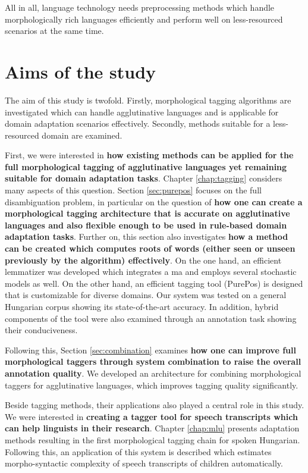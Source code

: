 All in all, language technology needs preprocessing methods which handle morphologically rich languages efficiently 
and perform well on less-resourced scenarios at the same time.

\section{Aims of the study}

The aim of this study is twofold. 
Firstly, morphological tagging algorithms are investigated which can handle agglutinative languages and is applicable for domain adaptation scenarios effectively. 
Secondly, methods suitable for a less-resourced domain are examined.

First, we were interested in \textbf{how existing methods can be applied for the full morphological tagging of agglutinative languages yet remaining suitable for domain adaptation tasks}. 
Chapter \ref{chap:tagging} considers many aspects of this question. 
Section \ref{sec:purepos} focuses on the full disambiguation problem, in particular on the question of \textbf{how one can create a morphological tagging architecture that is accurate on agglutinative languages and also flexible enough to be used in rule-based domain adaptation tasks}.
Further on,  this section also investigates \textbf{how a method can be created which computes roots of words (either seen or unseen previously by the algorithm) effectively}. 
On the one hand, an efficient lemmatizer was developed which integrates a \gls{ma} and employs several stochastic models as well. %
On the other hand, an efficient tagging tool (PurePos) is designed that is customizable for diverse domains.
Our system was tested on a general Hungarian corpus showing its state-of-the-art accuracy. 
In addition, hybrid components of the tool were also examined through an annotation task showing their conduciveness.


Following this, Section \ref{sec:combination} examines \textbf{how one can improve full morphological taggers through system combination to raise the overall annotation quality}.
We developed an architecture for combining morphological taggers for agglutinative languages, which improves tagging quality significantly.


Beside tagging methods, their applications also played a central role in this study.
We were interested in \textbf{creating a tagger tool for speech transcripts which can help linguists in their research}.
Chapter \ref{chap:mlu} presents adaptation methods resulting in the first morphological tagging chain for spoken Hungarian.
Following this, an application of this system is described which estimates morpho-syntactic complexity of speech transcripts of children automatically.

